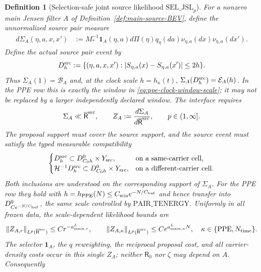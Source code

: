 \documentclass[11pt]{article}
\newtheorem{definition}[theorem]{Definition}
\newcommand{\one}{\mathbf 1}
\begin{document}
\begin{definition}[Selection-safe joint source likelihood
$\mathrm{SEL\_JSL}_{p}$]
For a nonzero main Jensen filter $A$ of
Definition~\ref{def:main-source-BEV}, define the \emph{unnormalized} source
pair measure
\begin{align}
 d\Sigma_A(\eta,a,x,x')
 &:=M_*^{-1}\one_A(\eta,a)
    d\Pi(\eta)q_\eta(da)
    \nu_{\eta,a}(dx)\nu_{\eta,a}(dx').
 \label{eq:unnormalized-selected-source-pair}
\end{align}
Define the actual source pair event by
\begin{equation}
\label{eq:exact-source-pair-event}
 D_h^{\rm src}:=\{(\eta,a,x,x'):
 |S_{\eta,a}(x)-S_{\eta,a}(x')|\le2h\}.
\end{equation}
Thus $\Sigma_A(1)=\mathcal B_A$ and, at the clock scale
$h=h_\kappa(t)$, $\Sigma_A(D_h^{\rm src})=\mathcal E_A(h)$.  In the PPE
row this is exactly the window in \eqref{eq:ppe-clock-window-scale}; it may
not be replaced by a larger independently declared window.  The interface
requires
\begin{equation}
\label{eq:joint-source-likelihood}
\Sigma_A\ll\overline{\mathsf R}^{\rm src},
 \qquad Z_A:=\frac{d\Sigma_A}{d\overline{\mathsf R}^{\rm src}},
 \qquad p\in(1,\infty].
\end{equation}
The proposal support must cover the source support, and the source event must
satisfy the typed measurable compatibility
\[
 \begin{cases}
 D_h^{\rm src}\subset D_{C_0h}^{0}\times Y_{\rm src},
   &\text{on a same-carrier cell},\\
 \mathcal H^{-1}D_h^{\rm src}\subset
   D_{C_0h}^{0}\times Y_{\rm src},
   &\text{on a different-carrier cell}.
 \end{cases}
\]
Both inclusions are understood on the corresponding support of $\Sigma_A$.
For the PPE row they hold with
$h=h_{\rm PPE}(N)\le C_{\rm win}e^{-N/C_{\rm buf}}$ and hence transfer into
$D_{C e^{-N/C_{\rm buf}}}^{0}$, the same scale controlled by
$\mathrm{PAIR\_TENERGY}$.
Uniformly in all
frozen data, the scale-dependent likelihood bounds are
\begin{equation}
\label{eq:selection-safe-likelihood-rates}
 \|Z_{A,r}\|_{L^p(\overline{\mathsf R}^{\rm src})}
 \le Cr^{-a_{{\rm main},r}^{L}},\qquad
 \|Z_{A,\kappa}\|_{L^p(\overline{\mathsf R}^{\rm src})}
 \le Ce^{a_{{\rm main},\kappa}^{L}N},
 \quad \kappa\in\{{\rm PPE},N_{\rm time}\}.
\end{equation}
The selector $\one_A$, the $q$ reweighting, the reciprocal proposal cost,
and all carrier-density costs occur in this single $Z_A$; neither
$\mathsf R_0$ nor $\zeta$ may depend on $A$.  Consequently

\end{definition}
\end{document}
